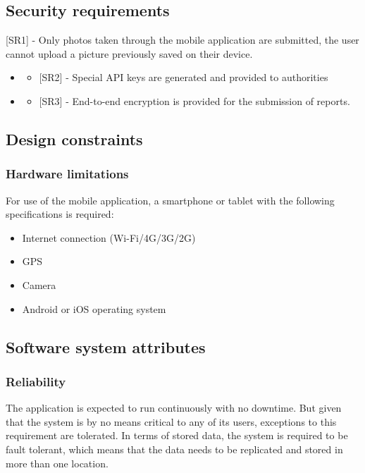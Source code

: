 \subsection{Security requirements} \label{sub-sect:security-requirements}

{[SR1]} - Only photos taken through the mobile application are submitted, the user cannot upload a picture previously saved on their device.
\begin{itemize}[label={}]
    \item \textbf{\goalPhotosAuthoritiesOnly}
    \begin{itemize}[label={}]
        \item {[SR2]} - Special API keys are generated and provided to authorities
    \end{itemize}
    \item \textbf{\goalCompromisedReports}
    \begin{itemize}[label={}]
        \item {[SR3]} - End-to-end encryption is provided for the submission of reports. 
    \end{itemize}
\end{itemize}

\subsection{Design constraints}


\subsubsection{Hardware limitations}

For use of the mobile application, a smartphone or tablet with the following specifications is required:
\begin{itemize}
   \item 
    Internet connection (Wi-Fi/4G/3G/2G)
   \item 
    GPS
   \item 
    Camera
   \item 
    Android or iOS operating system
\end{itemize}


\subsection{Software system attributes}
\subsubsection{Reliability}
The application is expected to run continuously with no downtime. But given that the system is by no means critical to any of its users, exceptions to this requirement are tolerated. In terms of stored data, the system is required to be fault tolerant, which means that the data needs to be replicated and stored in more than one location.

